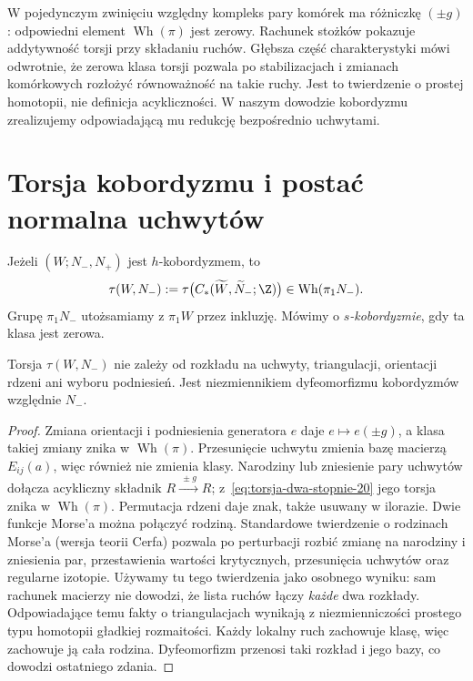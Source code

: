 \begin{uwaga}
\label{uwaga:wh-charakterystyka-20}
W pojedynczym zwinięciu względny kompleks pary
komórek ma różniczkę $(\pm g)$: odpowiedni element
$\operatorname{Wh}(\pi)$ jest zerowy. Rachunek stożków
pokazuje addytywność torsji przy składaniu ruchów.
Głębsza część charakterystyki mówi odwrotnie, że
zerowa klasa torsji pozwala po stabilizacjach i
zmianach komórkowych rozłożyć równoważność na takie
ruchy. Jest to twierdzenie o prostej homotopii,
nie definicja acykliczności. W naszym dowodzie
kobordyzmu zrealizujemy odpowiadającą mu redukcję
bezpośrednio uchwytami.
\end{uwaga}

\section{Torsja kobordyzmu i postać normalna uchwytów}
\label{sec:torsja-kobordyzmu-20}

\begin{definicja}
\label{def:torsja-hc-20}
Jeżeli $(W;N_-,N_+)$ jest $h$-kobordyzmem, to
\[
 \tau(W,N_-):=\tau\bigl(C_*(\widetilde W,
     \widetilde N_-;\Z)\bigr)
 \in\operatorname{Wh}(\pi_1N_-).
\]
Grupę $\pi_1N_-$ utożsamiamy z $\pi_1W$ przez
inkluzję. Mówimy o \emph{$s$-kobordyzmie}, gdy
ta klasa jest zerowa.
\end{definicja}

\begin{stwierdzenie}
\label{prop:niezaleznosc-torsji-20}
Torsja $\tau(W,N_-)$ nie zależy od rozkładu na
uchwyty, triangulacji, orientacji rdzeni ani wyboru
podniesień. Jest niezmiennikiem dyfeomorfizmu
kobordyzmów względnie $N_-$.
\end{stwierdzenie}
\begin{proof}
Zmiana orientacji i podniesienia generatora
$e$ daje $e\mapsto e(\pm g)$, a klasa takiej
zmiany znika w $\operatorname{Wh}(\pi)$.
Przesunięcie uchwytu zmienia bazę macierzą
$E_{ij}(a)$, więc również nie zmienia klasy.
Narodziny lub zniesienie pary uchwytów dołącza
acykliczny składnik $R\xrightarrow{\ \pm g\ }R$;
z~\eqref{eq:torsja-dwa-stopnie-20} jego torsja
znika w $\operatorname{Wh}(\pi)$.
Permutacja rdzeni daje znak, także usuwany w ilorazie.
Dwie funkcje Morse'a można połączyć rodziną.
Standardowe twierdzenie o rodzinach Morse'a
(wersja teorii Cerfa) pozwala po perturbacji
rozbić zmianę na narodziny i zniesienia par,
przestawienia wartości krytycznych, przesunięcia
uchwytów oraz regularne izotopie. Używamy tu
tego twierdzenia jako osobnego wyniku: sam
rachunek macierzy nie dowodzi, że lista ruchów
łączy \emph{każde} dwa rozkłady.
Odpowiadające temu fakty o triangulacjach
wynikają z niezmienniczości prostego typu
homotopii gładkiej rozmaitości.
Każdy lokalny ruch zachowuje klasę, więc zachowuje
ją cała rodzina. Dyfeomorfizm przenosi taki rozkład
i jego bazy, co dowodzi ostatniego zdania.
\end{proof}

